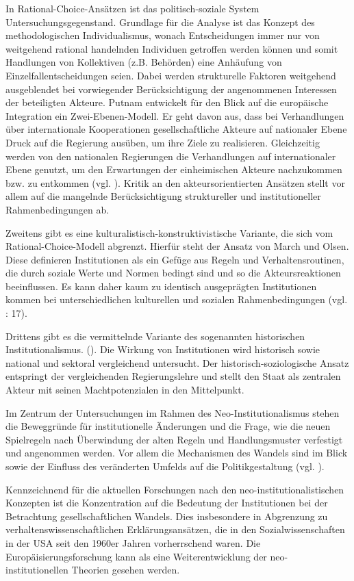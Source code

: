 In Rational-Choice-Ansätzen ist das politisch-soziale System Untersuchungsgegenstand. Grundlage für die Analyse ist das Konzept des methodologischen Individualismus, wonach Entscheidungen immer nur von weitgehend rational handelnden Individuen getroffen werden können und somit Handlungen von Kollektiven (z.B. Behörden) eine Anhäufung von Einzelfallentscheidungen seien. Dabei werden strukturelle Faktoren weitgehend ausgeblendet bei vorwiegender Berücksichtigung der angenommenen Interessen der beteiligten Akteure. Putnam entwickelt für den Blick auf die europäische Integration ein Zwei-Ebenen-Modell. Er geht davon aus, dass bei Verhandlungen über internationale Kooperationen gesellschaftliche Akteure auf nationaler Ebene Druck auf die Regierung ausüben, um ihre Ziele zu realisieren. Gleichzeitig werden von den nationalen Regierungen die Verhandlungen auf internationaler Ebene genutzt, um den Erwartungen der einheimischen Akteure nachzukommen bzw. zu entkommen (vgl. \cite{putnam}). Kritik an den akteursorientierten Ansätzen stellt vor allem auf die mangelnde Berücksichtigung struktureller und institutioneller Rahmenbedingungen ab.\par
Zweitens gibt es eine kulturalistisch-konstruktivistische Variante, die sich vom Rational-Choice-Modell abgrenzt. Hierfür steht der Ansatz von March und Olsen. Diese definieren Institutionen als ein Gefüge aus Regeln und Verhaltensroutinen, die durch soziale Werte und Normen bedingt sind und so die Akteursreaktionen beeinflussen. Es kann daher kaum zu identisch ausgeprägten Institutionen kommen bei unterschiedlichen kulturellen und sozialen Rahmenbedingungen (vgl. \cite{marols}: 17).\par
Drittens gibt es die vermittelnde Variante des sogenannten historischen Institutionalismus. (\cite{haltay, steinmo}). Die Wirkung von Institutionen wird historisch sowie national und sektoral vergleichend untersucht. Der historisch-soziologische Ansatz entspringt der vergleichenden Regierungslehre und stellt den Staat als zentralen Akteur mit seinen Machtpotenzialen in den Mittelpunkt.\par
Im Zentrum der Untersuchungen im Rahmen des Neo-Institutionalismus stehen die Beweggründe für institutionelle Änderungen und die Frage, wie die neuen Spielregeln nach Überwindung der alten Regeln und Handlungsmuster verfestigt und angenommen werden. Vor allem die Mechanismen des Wandels sind im Blick sowie der Einfluss des veränderten Umfelds auf die Politikgestaltung (vgl. \cite{huszak}).\par
Kennzeichnend für die aktuellen Forschungen nach den neo-institutionalistischen Konzepten ist die Konzentration auf die Bedeutung der Institutionen bei der Betrachtung gesellschaftlichen Wandels. Dies insbesondere in Abgrenzung zu verhaltenswissenschaftlichen Erklärungsansätzen, die in den Sozialwissenschaften in der USA seit den 1960er Jahren vorherrschend waren. Die Europäisierungsforschung kann als eine Weiterentwicklung der neo-institutionellen Theorien gesehen werden. \par
